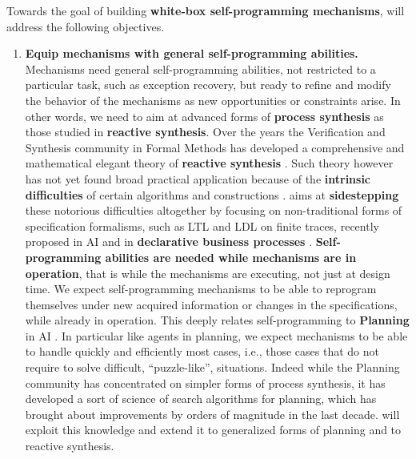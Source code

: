 Towards the goal of building \textbf{white-box self-programming mechanisms}, \project will address the following objectives. %
\begin{enumerate}

\item \textbf{Equip mechanisms with general self-programming abilities.}
Mechanisms need general self-programming abilities, not
  restricted to a particular task, such as exception recovery, but ready
  to refine and modify the behavior of the mechanisms as new
  opportunities or constraints arise. In other words, we need to aim at                           
  advanced forms of \textbf{process synthesis} as those studied in
  \textbf{reactive synthesis}.  Over the years the Verification and Synthesis
  community in Formal Methods has developed a comprehensive and
  mathematical elegant theory of \textbf{reactive synthesis}
  \cite{PnRo89}.  Such theory however has not yet found broad practical
  application because of the \textbf{intrinsic difficulties} of
  certain algorithms and constructions \cite{TsaiFVT14}.
  \project aims at \textbf{sidestepping} these notorious difficulties
    altogether by focusing on non-traditional forms of
  specification formalisms, such as LTL and LDL on finite
    traces, recently proposed in
  AI \cite{TorresB15,DeVa15,DeVa16,CamachoTMBM17} 
and in \textbf{declarative business
    processes} \cite{AalstPS09}.
\textbf{Self-programming abilities are needed while mechanisms
    are in operation}, that is while the mechanisms are executing, not
  just at design time. We expect self-programming mechanisms to be
  able to reprogram themselves under new acquired information or
  changes in the specifications, while already in operation. This
  deeply relates self-programming to \textbf{Planning} in AI
  \cite{GeffnerBo13,GNT2016,NauGT15}.
  In particular like agents in planning, we expect mechanisms to be
  able to handle quickly and efficiently most cases, i.e., those cases
  that do not require to solve difficult, ``puzzle-like'',
  situations. Indeed while the Planning community has concentrated on
  simpler forms of process synthesis, it has developed a sort of
  science of search algorithms for planning, which has brought about
  improvements by orders of magnitude in the last
  decade. \cite{PommereningHB17,SteinmetzH17,LipovetzkyG17,DeGMMP17} \project will exploit this knowledge and
  extend it to generalized forms of planning and to reactive
  synthesis.



\end{enumerate}

